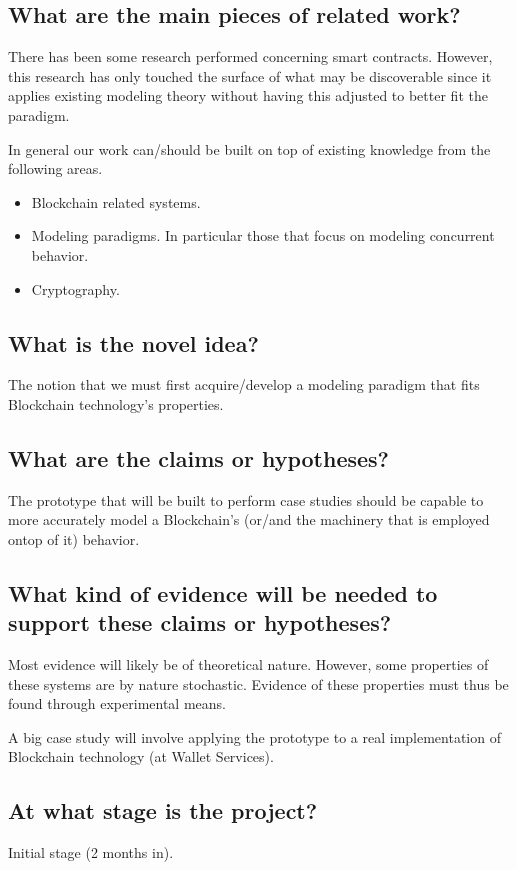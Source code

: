 \documentclass[]{article}
\begin{document}
{\subsection{What are the main pieces of related work?}
There has been some research performed concerning smart contracts. However, this research has only touched the surface of what may be discoverable since it applies existing modeling theory without having this adjusted to better fit the paradigm.

In general our work can/should be built on top of existing knowledge from the following areas.
\begin{itemize}
	\item Blockchain related systems.
	\item Modeling paradigms. In particular those that focus on modeling concurrent behavior.
	\item Cryptography.
\end{itemize}

\subsection{What is the novel idea?}
The notion that we must first acquire/develop a modeling paradigm that fits Blockchain technology's properties.

\subsection{What are the claims or hypotheses?}
The prototype that will be built to perform case studies should be capable to more accurately model a Blockchain's (or/and the machinery that is employed ontop of it) behavior.

\subsection{What kind of evidence will be needed to support these claims or hypotheses?}
Most evidence will likely be of theoretical nature. However, some properties of these systems are by nature stochastic. Evidence of these properties must thus be found through experimental means.

A big case study will involve applying the prototype to a real implementation of Blockchain technology (at Wallet Services).

\subsection{At what stage is the project?}
Initial stage (2 months in).
}
\end{document}

